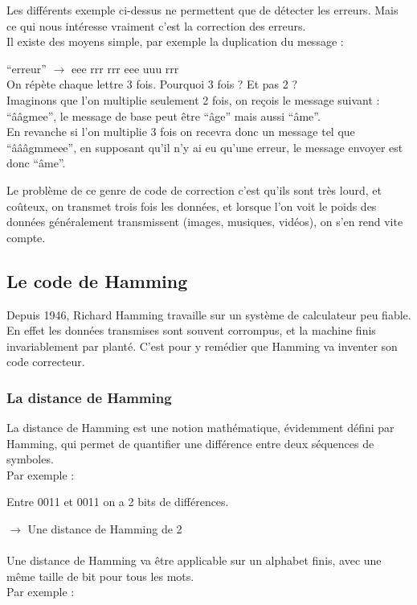 Les différents exemple ci-dessus ne permettent que de détecter les erreurs. Mais ce qui nous intéresse vraiment c'est la correction des erreurs.
\\ Il existe des moyens simple, par exemple la duplication du message :

\tab ``erreur'' $\rightarrow$ eee rrr rrr eee uuu rrr
\\ On répète chaque lettre 3 fois. Pourquoi 3 fois ? Et pas 2 ?
\\ Imaginons que l'on multiplie seulement 2 fois, on reçois le message suivant : ``ââgmee'', le message de base peut être ``âge'' mais aussi ``âme''.
\\ En revanche si l'on multiplie 3 fois on recevra donc un message tel que ``âââgmmeee'', en supposant qu'il n'y ai eu qu'une erreur, le message envoyer est donc ``âme''.

\tab Le problème de ce genre de code de correction c'est qu'ils sont très lourd, et coûteux, on transmet trois fois les données, et lorsque l'on voit le poids des données généralement transmissent (images, musiques, vidéos), on s'en rend vite compte.

\subsection{Le code de Hamming}
\label{sub:Le code de Hamming}

Depuis 1946, Richard Hamming travaille sur un système de calculateur peu fiable. En effet les données transmises sont souvent corrompus, et la machine finis invariablement par planté. C’est pour y remédier que Hamming va inventer son code correcteur.

\subsubsection{La distance de Hamming}
\label{subs:La distance de Hamming}

La distance de Hamming est une notion mathématique, évidemment défini par Hamming, qui permet de quantifier une différence entre deux séquences de symboles.
\\ Par exemple :

\tab Entre 0011 et 0011 on a 2 bits de différences.

\hspace{2cm} $\rightarrow$ Une distance de Hamming de 2
\\
\\ Une distance de Hamming va être applicable sur un alphabet finis, avec une même taille de bit pour tous les mots.
\\ Par exemple :

